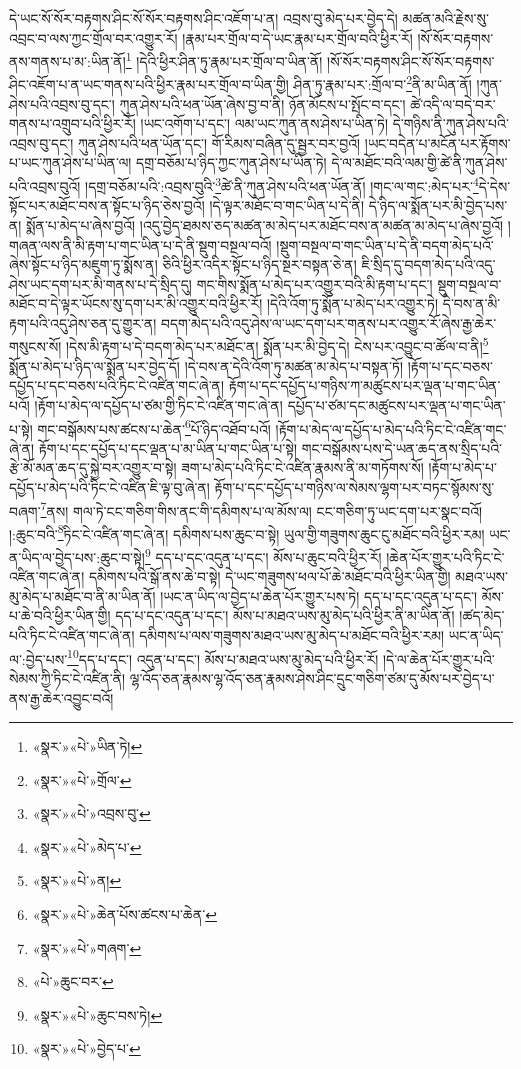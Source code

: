 དེ་ཡང་སོ་སོར་བརྟགས་ཤིང་སོ་སོར་བརྟགས་ཤིང་འཇོག་པ་ན། འབྲས་བུ་མེད་པར་བྱེད་དེ། མཚན་མའི་རྗེས་སུ་འབྲང་བ་ལས་ཀྱང་གྲོལ་བར་འགྱུར་རོ། །རྣམ་པར་གྲོལ་བ་དེ་ཡང་རྣམ་པར་གྲོལ་བའི་ཕྱིར་རོ། །སོ་སོར་བརྟགས་ནས་གནས་པ་མ་:ཡིན་ནོ།\footnote{«སྣར་»«པེ་»ཡིན་ཏེ།} །དེའི་ཕྱིར་ཤིན་ཏུ་རྣམ་པར་གྲོལ་བ་ཡིན་ནོ། །སོ་སོར་བརྟགས་ཤིང་སོ་སོར་བརྟགས་ཤིང་འཇོག་པ་ན་ཡང་གནས་པའི་ཕྱིར་རྣམ་པར་གྲོལ་བ་ཡིན་གྱི། ཤིན་ཏུ་རྣམ་པར་:གྲོལ་བ་\footnote{«སྣར་»«པེ་»གྲོལ་}ནི་མ་ཡིན་ནོ། །ཀུན་ཤེས་པའི་འབྲས་བུ་དང་། ཀུན་ཤེས་པའི་ཕན་ཡོན་ཞེས་བྱ་བ་ནི། ཉོན་མོངས་པ་སྤོང་བ་དང་། ཚེ་འདི་ལ་བདེ་བར་གནས་པ་འགྲུབ་པའི་ཕྱིར་རོ། །ཡང་འགོག་པ་དང་། ལམ་ཡང་ཀུན་ནས་ཤེས་པ་ཡིན་ཏེ། དེ་གཉིས་ནི་ཀུན་ཤེས་པའི་འབྲས་བུ་དང་། ཀུན་ཤེས་པའི་ཕན་ཡོན་དང་། གོ་རིམས་བཞིན་དུ་སྦྱར་བར་བྱའོ། །ཡང་བདེན་པ་མངོན་པར་རྟོགས་པ་ཡང་ཀུན་ཤེས་པ་ཡིན་ལ། དགྲ་བཅོམ་པ་ཉིད་ཀྱང་ཀུན་ཤེས་པ་ཡིན་ཏེ། དེ་ལ་མཐོང་བའི་ལམ་གྱི་ཚེ་ནི་ཀུན་ཤེས་པའི་འབྲས་བུའོ། །དགྲ་བཅོམ་པའི་:འབྲས་བུའི་\footnote{«སྣར་»«པེ་»འབྲས་བུ་}ཚེ་ནི་ཀུན་ཤེས་པའི་ཕན་ཡོན་ནོ། །གང་ལ་གང་:མེད་པར་\footnote{«སྣར་»«པེ་»མེད་པ་}དེ་དེས་སྟོང་པར་མཐོང་བས་ན་སྟོང་པ་ཉིད་ཅེས་བྱའོ། །དེ་ལྟར་མཐོང་བ་གང་ཡིན་པ་དེ་ནི། དེ་ཉིད་ལ་སྨོན་པར་མི་བྱེད་པས་ན། སྨོན་པ་མེད་པ་ཞེས་བྱའོ། །འདུ་བྱེད་ཐམས་ཅད་མཚན་མ་མེད་པར་མཐོང་བས་ན་མཚན་མ་མེད་པ་ཞེས་བྱའོ། །གཞན་ལས་ནི་མི་རྟག་པ་གང་ཡིན་པ་དེ་ནི་སྡུག་བསྔལ་བའོ། །སྡུག་བསྔལ་བ་གང་ཡིན་པ་དེ་ནི་བདག་མེད་པའོ་ཞེས་སྟོང་པ་ཉིད་མཇུག་ཏུ་སྨོས་ན། ཅིའི་ཕྱིར་འདིར་སྟོང་པ་ཉིད་སྔར་བསྟན་ཅེ་ན། ཇི་སྲིད་དུ་བདག་མེད་པའི་འདུ་ཤེས་ཡང་དག་པར་མི་གནས་པ་དེ་སྲིད་དུ། གང་གིས་སྨོན་པ་མེད་པར་འགྱུར་བའི་མི་རྟག་པ་དང་། སྡུག་བསྔལ་བ་མཐོང་བ་དེ་ལྟར་ཡོངས་སུ་དག་པར་མི་འགྱུར་བའི་ཕྱིར་རོ། །དེའི་འོག་ཏུ་སྨོན་པ་མེད་པར་འགྱུར་ཏེ། དེ་བས་ན་མི་རྟག་པའི་འདུ་ཤེས་ཅན་དུ་གྱུར་ན། བདག་མེད་པའི་འདུ་ཤེས་ལ་ཡང་དག་པར་གནས་པར་འགྱུར་རོ་ཞེས་རྒྱ་ཆེར་གསུངས་སོ། །དེས་མི་རྟག་པ་དེ་བདག་མེད་པར་མཐོང་ན། སྨོན་པར་མི་བྱེད་དེ། ངེས་པར་འབྱུང་བ་ཚོལ་བ་ནི།\footnote{«སྣར་»«པེ་»ན།} སྨོན་པ་མེད་པ་ཉིད་ལ་སྨོན་པར་བྱེད་དོ། །དེ་བས་ན་དེའི་འོག་ཏུ་མཚན་མ་མེད་པ་བསྟན་ཏོ། །རྟོག་པ་དང་བཅས་དཔྱོད་པ་དང་བཅས་པའི་ཏིང་ངེ་འཛིན་གང་ཞེ་ན། རྟོག་པ་དང་དཔྱོད་པ་གཉིས་ཀ་མཚུངས་པར་ལྡན་པ་གང་ཡིན་པའོ། །རྟོག་པ་མེད་ལ་དཔྱོད་པ་ཙམ་གྱི་ཏིང་ངེ་འཛིན་གང་ཞེ་ན། དཔྱོད་པ་ཙམ་དང་མཚུངས་པར་ལྡན་པ་གང་ཡིན་པ་སྟེ། གང་བསྒོམས་པས་ཚངས་པ་ཆེན་\footnote{«སྣར་»«པེ་»ཆེན་པོས་ཚངས་པ་ཆེན་}པོ་ཉིད་འཐོབ་པའོ། །རྟོག་པ་མེད་ལ་དཔྱོད་པ་མེད་པའི་ཏིང་ངེ་འཛིན་གང་ཞེ་ན། རྟོག་པ་དང་དཔྱོད་པ་དང་ལྡན་པ་མ་ཡིན་པ་གང་ཡིན་པ་སྟེ། གང་བསྒོམས་པས་དེ་ཡན་ཆད་ནས་སྲིད་པའི་རྩེ་མོ་མན་ཆད་དུ་སྐྱེ་བར་འགྱུར་བ་སྟེ། ཟག་པ་མེད་པའི་ཏིང་ངེ་འཛིན་རྣམས་ནི་མ་གཏོགས་སོ། །རྟོག་པ་མེད་པ་དཔྱོད་པ་མེད་པའི་ཏིང་ངེ་འཛིན་ཇི་ལྟ་བུ་ཞེ་ན། རྟོག་པ་དང་དཔྱོད་པ་གཉིས་ལ་སེམས་ལྷག་པར་བཏང་སྙོམས་སུ་བཞག་\footnote{«སྣར་»«པེ་»གཞག་}ནས། གལ་ཏེ་ངང་གཅིག་གིས་ནང་གི་དམིགས་པ་ལ་མོས་ལ། ངང་གཅིག་ཏུ་ཡང་དག་པར་སྣང་བའོ། །:ཆུང་བའི་\footnote{«པེ་»ཆུང་བར་}ཏིང་ངེ་འཛིན་གང་ཞེ་ན། དམིགས་པས་ཆུང་བ་སྟེ། ཡུལ་གྱི་གཟུགས་ཆུང་ངུ་མཐོང་བའི་ཕྱིར་རམ། ཡང་ན་ཡིད་ལ་བྱེད་པས་:ཆུང་བ་སྟེ།\footnote{«སྣར་»«པེ་»ཆུང་བས་ཏེ།} དད་པ་དང་འདུན་པ་དང་། མོས་པ་ཆུང་བའི་ཕྱིར་རོ། །ཆེན་པོར་གྱུར་པའི་ཏིང་ངེ་འཛིན་གང་ཞེ་ན། དམིགས་པའི་སྒོ་ནས་ཆེ་བ་སྟེ། དེ་ཡང་གཟུགས་ཕལ་པོ་ཆེ་མཐོང་བའི་ཕྱིར་ཡིན་གྱི། མཐའ་ཡས་མུ་མེད་པ་མཐོང་བ་ནི་མ་ཡིན་ནོ། །ཡང་ན་ཡིད་ལ་བྱེད་པ་ཆེན་པོར་གྱུར་པས་ཏེ། དད་པ་དང་འདུན་པ་དང་། མོས་པ་ཆེ་བའི་ཕྱིར་ཡིན་གྱི། དད་པ་དང་འདུན་པ་དང་། མོས་པ་མཐའ་ཡས་མུ་མེད་པའི་ཕྱིར་ནི་མ་ཡིན་ནོ། །ཚད་མེད་པའི་ཏིང་ངེ་འཛིན་གང་ཞེ་ན། དམིགས་པ་ལས་གཟུགས་མཐའ་ཡས་མུ་མེད་པ་མཐོང་བའི་ཕྱིར་རམ། ཡང་ན་ཡིད་ལ་:བྱེད་པས་\footnote{«སྣར་»«པེ་»བྱེད་པ་}དད་པ་དང་། འདུན་པ་དང་། མོས་པ་མཐའ་ཡས་མུ་མེད་པའི་ཕྱིར་རོ། །དེ་ལ་ཆེན་པོར་གྱུར་པའི་སེམས་ཀྱི་ཏིང་ངེ་འཛིན་ནི། ལྷ་འོད་ཅན་རྣམས་ལྷ་འོད་ཅན་རྣམས་ཤེས་ཤིང་དྲུང་གཅིག་ཙམ་དུ་མོས་པར་བྱེད་པ་ནས་རྒྱ་ཆེར་འབྱུང་བའོ། 